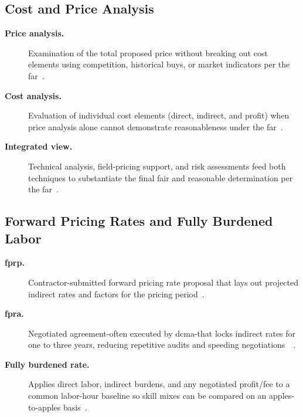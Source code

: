 \documentclass[../main.tex]{subfiles}
\begin{document}
\subsection{Cost and Price Analysis}
\begin{description}
  \item[\textbf{Price analysis.}] Examination of the total proposed price without breaking out cost elements using competition, historical buys, or market indicators per the \ac{far}~\autocite[\S~15.404-1(b)]{FAR}.
  \item[\textbf{Cost analysis.}] Evaluation of individual cost elements (direct, indirect, and profit) when price analysis alone cannot demonstrate reasonableness under the \ac{far}~\autocite[\S~15.404-1(c)]{FAR}.
  \item[\textbf{Integrated view.}] Technical analysis, field-pricing support, and risk assessments feed both techniques to substantiate the final fair and reasonable determination per the \ac{far}~\autocite[\S~15.404-1(a)(5)]{FAR}.
\end{description}

\subsection{Forward Pricing Rates and Fully Burdened Labor}
\begin{description}
  \item[\textbf{\ac{fprp}.}] Contractor-submitted forward pricing rate proposal that lays out projected indirect rates and factors for the pricing period~\autocite[\S~15.407-3(a)]{FAR}.
  \item[\textbf{\ac{fpra}.}] Negotiated agreement-often executed by \ac{dcma}-that locks indirect rates for one to three years, reducing repetitive audits and speeding negotiations~\autocite[\S~15.407-3(c)]{FAR}~\autocite{edo-3-2-4-cost-price-evaluation-2024}.
  \item[\textbf{Fully burdened rate.}] Applies direct labor, indirect burdens, and any negotiated profit/fee to a common labor-hour baseline so skill mixes can be compared on an apples-to-apples basis~\autocite{edo-3-2-4-cost-price-evaluation-2024}.
\end{description}
\end{document}
